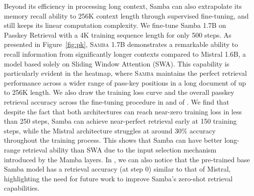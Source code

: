 \documentclass{article}
\begin{document}
Beyond its efficiency in processing long context, Samba can also extrapolate its memory recall ability to 256K context length through supervised fine-tuning, and still keeps its linear computation complexity. We fine-tune Samba 1.7B on Passkey Retrieval with a 4K training sequence length for only 500 steps.
As presented in Figure~\ref{fig:pk}, \textsc{Samba} 1.7B demonstrates a remarkable ability to recall information from significantly longer contexts compared to Mistral 1.6B, a model based solely on Sliding Window Attention (SWA). This capability is particularly evident in the heatmap, where \textsc{Samba} maintains the perfect retrieval performance across a wider range of pass-key positions in a long document of up to 256K length. We also draw the training loss curve and the overall passkey retrieval accuracy across the fine-tuning procedure in   and  of . We find that despite the fact that both architectures can reach near-zero training loss in less than 250 steps, Samba can achieve near-perfect retrieval early at 150 training steps, while the Mistral architecture struggles at around 30\% accuracy throughout the training process. This shows that Samba can have better long-range retrieval ability than SWA due to the input selection mechanism introduced by the Mamba layers.  In , we can also notice that the pre-trained base Samba model has a retrieval accuracy (at step 0) similar to that of Mistral, highlighting the need for future work to improve Samba's zero-shot retrieval capabilities. 
\end{document}
